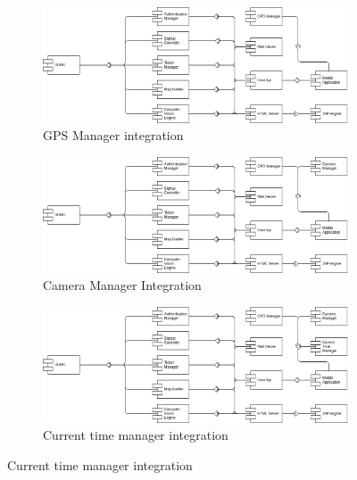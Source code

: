 \documentclass{article}
\begin{document}
	\begin{figure}[h]
	\centering
		\caption{Mobile Security Integration}
		\label{fig:integrationMobileSec}
		\begin{subfigure}[H]{\linewidth}
			\includegraphics[width=\linewidth]{images/integration_mobile_security_1.png}
			\caption{GPS Manager integration}
		\end{subfigure}
		\begin{subfigure}[H]{\linewidth}
			\includegraphics[width=\linewidth]{images/integration_mobile_security_2.png}
			\caption{Camera Manager Integration}
		\end{subfigure}
		\begin{subfigure}[H]{\linewidth}
			\includegraphics[width=\linewidth]{images/integration_mobile_security_3.png}
			\caption{Current time manager integration}
		\end{subfigure}
	\end{figure}
\end{document}
